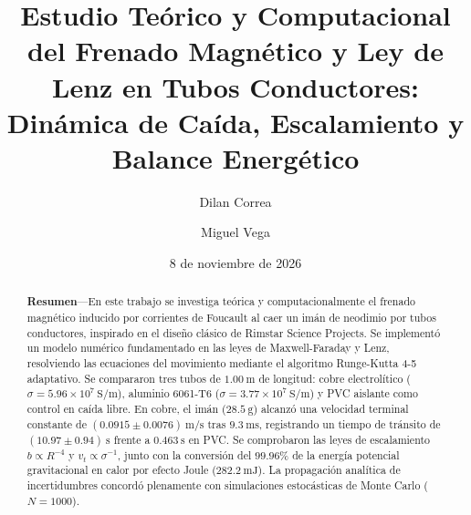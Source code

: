 \documentclass[aps,prb,reprint,twocolumn,superscriptaddress,amsmath,amssymb,floatfix]{revtex4-2}
\begin{document}
\title{Estudio Teórico y Computacional del Frenado Magnético y Ley de Lenz en Tubos Conductores: Dinámica de Caída, Escalamiento y Balance Energético}

\author{Dilan Correa}

\author{Miguel Vega}

\date{8 de noviembre de 2026}

\begin{abstract}
\textbf{Resumen}---En este trabajo se investiga teórica y computacionalmente el frenado magnético inducido por corrientes de Foucault al caer un imán de neodimio por tubos conductores, inspirado en el diseño clásico de Rimstar Science Projects. Se implementó un modelo numérico fundamentado en las leyes de Maxwell-Faraday y Lenz, resolviendo las ecuaciones del movimiento mediante el algoritmo Runge-Kutta 4-5 adaptativo. Se compararon tres tubos de $1.00\ \mathrm{m}$ de longitud: cobre electrolítico ($\sigma = 5.96 \times 10^7\ \mathrm{S/m}$), aluminio 6061-T6 ($\sigma = 3.77 \times 10^7\ \mathrm{S/m}$) y PVC aislante como control en caída libre. En cobre, el imán ($28.5\ \mathrm{g}$) alcanzó una velocidad terminal constante de $(0.0915 \pm 0.0076)\ \mathrm{m/s}$ tras $9.3\ \mathrm{ms}$, registrando un tiempo de tránsito de $(10.97 \pm 0.94)\ \mathrm{s}$ frente a $0.463\ \mathrm{s}$ en PVC. Se comprobaron las leyes de escalamiento $b \propto R^{-4}$ y $v_t \propto \sigma^{-1}$, junto con la conversión del $99.96\%$ de la energía potencial gravitacional en calor por efecto Joule ($282.2\ \mathrm{mJ}$). La propagación analítica de incertidumbres concordó plenamente con simulaciones estocásticas de Monte Carlo ($N=1000$).


\end{abstract}
\end{document}
